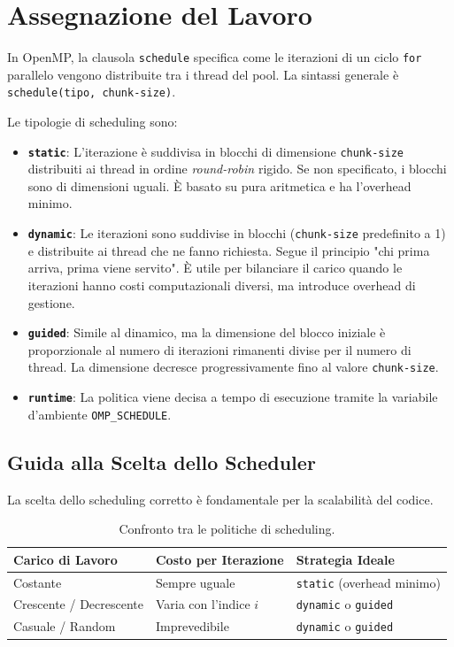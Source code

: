 \section{Assegnazione del Lavoro}

In OpenMP, la clausola \texttt{schedule} specifica come le iterazioni di un ciclo \texttt{for} parallelo vengono distribuite tra i thread del pool. La sintassi generale è \texttt{schedule(tipo, chunk-size)}. 

Le tipologie di scheduling sono:

\begin{itemize}
    \item \textbf{\texttt{static}}: L'iterazione è suddivisa in blocchi di dimensione \texttt{chunk-size} distribuiti ai thread in ordine \textit{round-robin} rigido. Se non specificato, i blocchi sono di dimensioni uguali. È basato su pura aritmetica e ha l'overhead minimo.
    \item \textbf{\texttt{dynamic}}: Le iterazioni sono suddivise in blocchi (\texttt{chunk-size} predefinito a 1) e distribuite ai thread che ne fanno richiesta. Segue il principio "chi prima arriva, prima viene servito". È utile per bilanciare il carico quando le iterazioni hanno costi computazionali diversi, ma introduce overhead di gestione.
    \item \textbf{\texttt{guided}}: Simile al dinamico, ma la dimensione del blocco iniziale è proporzionale al numero di iterazioni rimanenti divise per il numero di thread. La dimensione decresce progressivamente fino al valore \texttt{chunk-size}.
    \item \textbf{\texttt{runtime}}: La politica viene decisa a tempo di esecuzione tramite la variabile d'ambiente \texttt{OMP\_SCHEDULE}.
\end{itemize}

\subsection{Guida alla Scelta dello Scheduler}

La scelta dello scheduling corretto è fondamentale per la scalabilità del codice.

\begin{table}[h]
\centering
\begin{tabular}{|l|l|l|}
\hline
\textbf{Carico di Lavoro} & \textbf{Costo per Iterazione} & \textbf{Strategia Ideale} \\ \hline
Costante & Sempre uguale & \texttt{static} (overhead minimo) \\ \hline
Crescente / Decrescente & Varia con l'indice $i$ & \texttt{dynamic} o \texttt{guided} \\ \hline
Casuale / Random & Imprevedibile & \texttt{dynamic} o \texttt{guided} \\ \hline
\end{tabular}
\caption{Confronto tra le politiche di scheduling.}
\end{table}

